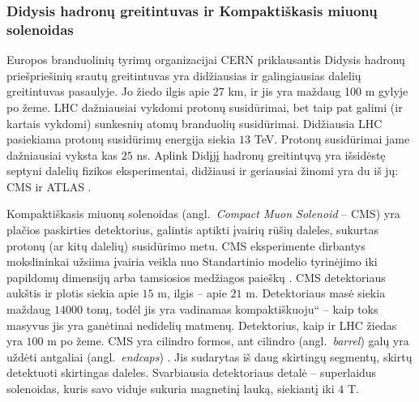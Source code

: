 \documentclass[a4paper, 12pt]{article}
\newcommand{\ltq}[1]{{\quotedblbase{}#1\textquotedblleft{}}}
\newlength\q
\begin{document}
\vspace{-0.3cm}
\subsubsection{Didysis hadronų greitintuvas ir Kompaktiškasis miuonų solenoidas}
Europos branduolinių tyrimų organizacijai CERN priklausantis Didysis hadronų priešpriešinių srautų greitintuvas yra didžiausias ir galingiausias dalelių greitintuvas pasaulyje. Jo žiedo ilgis apie 27 km, ir jis yra maždaug 100 m gylyje po žeme. LHC dažniausiai vykdomi protonų susidūrimai, bet taip pat galimi (ir kartais vykdomi) sunkesnių atomų branduolių susidūrimai. Didžiausia LHC pasiekiama protonų susidūrimų energija siekia $13$ TeV. Protonų susidūrimai jame dažniausiai vyksta kas $25$ ns. Aplink Didįjį hadronų greitintųvą yra išsidėstę septyni dalelių fizikos eksperimentai, didžiausi ir geriausiai žinomi yra du iš jų: CMS ir ATLAS \cite{LHCexperiments}.

Kompaktiškasis miuonų solenoidas (angl.\ \textit{Compact Muon Solenoid} -- CMS) yra plačios paskirties detektorius, galintis aptikti įvairių rūšių daleles, sukurtas protonų (ar kitų dalelių) susidūrimo metu. CMS eksperimente dirbantys mokslininkai užsiima įvairia veikla nuo Standartinio modelio tyrinėjimo iki papildomų dimensijų arba tamsiosios medžiagos paieškų \cite{CMSdetector}.
CMS detektoriaus aukštis ir plotis siekia apie $15$ m, ilgis -- apie $21$ m. Detektoriaus masė siekia maždaug $14000$ tonų, todėl jis yra vadinamas \ltq{kompaktiškuoju} -- kaip toks masyvus jis yra ganėtinai nedidelių matmenų. Detektorius, kaip ir LHC žiedas yra $100$ m po žeme. CMS yra cilindro formos, ant cilindro (angl.\ \textit{barrel}) galų yra uždėti antgaliai (angl.\ \textit{endcaps}) \cite{cmseta}. Jis sudarytas iš daug skirtingų segmentų, skirtų detektuoti skirtingas daleles. Svarbiausia detektoriaus detalė -- superlaidus solenoidas, kuris savo viduje sukuria magnetinį lauką, siekiantį iki $4$ T.
\end{document}
